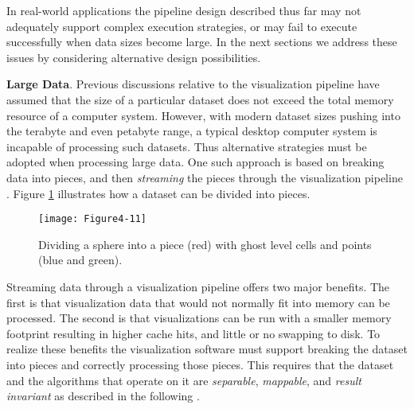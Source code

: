 In real-world applications the pipeline design described thus far may not adequately support complex execution strategies, or may fail to execute successfully when data sizes become large. In the next sections we address these issues by considering alternative design possibilities.

\textbf{Large Data}. Previous discussions relative to the visualization pipeline have assumed that the size of a particular dataset does not exceed the total memory resource of a computer system. However, with modern dataset sizes pushing into the terabyte and even petabyte range, a typical desktop computer system is incapable of processing such datasets. Thus alternative strategies must be adopted when processing large data. One such approach is based on breaking data into pieces, and then \emph{streaming} the pieces through the visualization pipeline \cite{Martin01}. Figure \ref{fig:Figure4-11} illustrates how a dataset can be divided into pieces.

\begin{figure}[!htb]
  \centering
  \texttt{[image: Figure4-11]}\\
  \caption{Dividing a sphere into a piece (red) with ghost level cells and points (blue and green).}\label{fig:Figure4-11}
\end{figure}

Streaming data through a visualization pipeline offers two major benefits. The first is that visualization data that would not normally fit into memory can be processed. The second is that visualizations can be run with a smaller memory footprint resulting in higher cache hits, and little or no swapping to disk. To realize these benefits the visualization software must support breaking the dataset into pieces and correctly processing those pieces. This requires that the dataset and the algorithms that operate on it are \emph{separable}, \emph{mappable}, and \emph{result invariant} as described in the following \cite{Law99}.

